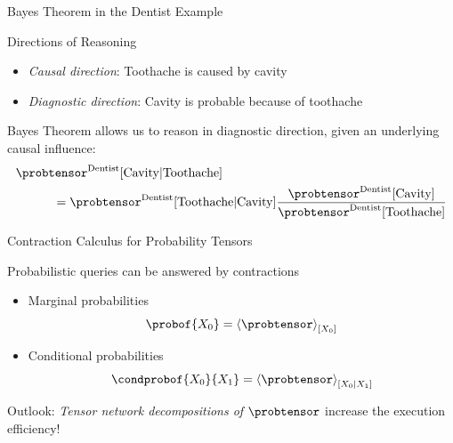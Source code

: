\documentclass{beamer}
\begin{document}
\begin{frame}{Bayes Theorem in the Dentist Example}

Directions of Reasoning
\begin{itemize}
	\item \emph{Causal direction}: Toothache is caused by cavity
	\item \emph{Diagnostic direction}: Cavity is probable because of toothache
\end{itemize}

\medskip

Bayes Theorem allows us to reason in diagnostic direction, given an underlying causal influence:
\begin{align*}
	& \probtensor^{\mathrm{Dentist}}[\mathrm{Cavity}|\mathrm{Toothache}] \\
	 & \quad\quad\quad =  
	\probtensor^{\mathrm{Dentist}}[\mathrm{Toothache}|\mathrm{Cavity}] 
	\frac{\probtensor^{\mathrm{Dentist}}[\mathrm{Cavity}] }{\probtensor^{\mathrm{Dentist}}[\mathrm{Toothache}]}
\end{align*}

\end{frame}





\begin{frame}{Contraction Calculus for Probability Tensors}

Probabilistic queries can be answered by contractions
\begin{itemize}
	\item Marginal probabilities 
		\[ \probof{\exrandom} = \contractionof{\probtensor}{\exrandom} \]
	\item Conditional probabilities
		\[ \condprobof{\exrandom}{\secexrandom} = \normalizationofwrt{\probtensor}{\exrandom}{\secexrandom} \]
\end{itemize}

\medskip 

Outlook: \emph{Tensor network decompositions of $\probtensor$} increase the execution efficiency!

\end{frame}
\end{document}
